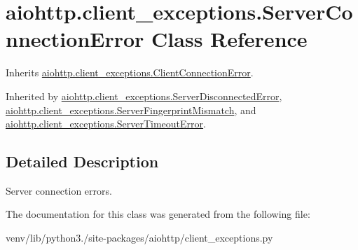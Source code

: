 \hypertarget{classaiohttp_1_1client__exceptions_1_1_server_connection_error}{}\section{aiohttp.\+client\+\_\+exceptions.\+Server\+Connection\+Error Class Reference}
\label{classaiohttp_1_1client__exceptions_1_1_server_connection_error}


Inherits \hyperlink{classaiohttp_1_1client__exceptions_1_1_client_connection_error}{aiohttp.\+client\+\_\+exceptions.\+Client\+Connection\+Error}.



Inherited by \hyperlink{classaiohttp_1_1client__exceptions_1_1_server_disconnected_error}{aiohttp.\+client\+\_\+exceptions.\+Server\+Disconnected\+Error}, \hyperlink{classaiohttp_1_1client__exceptions_1_1_server_fingerprint_mismatch}{aiohttp.\+client\+\_\+exceptions.\+Server\+Fingerprint\+Mismatch}, and \hyperlink{classaiohttp_1_1client__exceptions_1_1_server_timeout_error}{aiohttp.\+client\+\_\+exceptions.\+Server\+Timeout\+Error}.



\subsection{Detailed Description}
\begin{DoxyVerb}Server connection errors.\end{DoxyVerb}
 

The documentation for this class was generated from the following file\+:\begin{DoxyCompactItemize}
\item 
venv/lib/python3./site-\/packages/aiohttp/client\+\_\+exceptions.\+py\end{DoxyCompactItemize}
